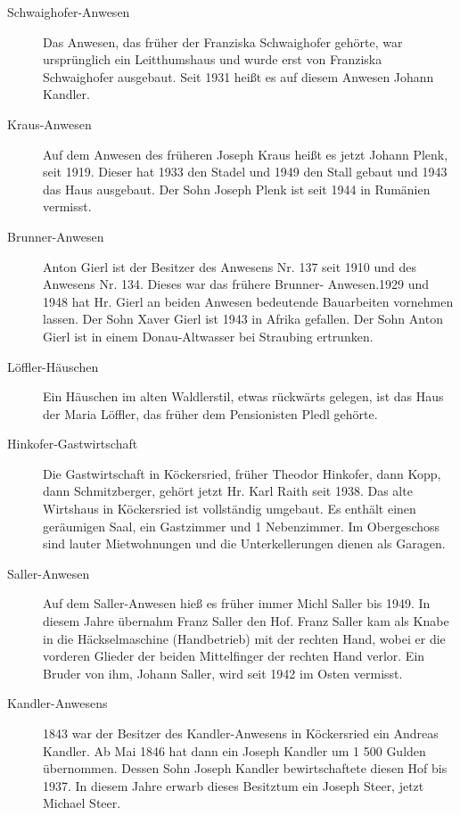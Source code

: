 \documentclass{book}
\begin{document}
\begin{description}
\item[Schwaighofer-Anwesen] Das Anwesen, das früher der Franziska
Schwaighofer gehörte, war ursprünglich ein Leitthumshaus und wurde erst
von Franziska Schwaighofer ausgebaut. Seit 1931 heißt es auf diesem
Anwesen Johann Kandler.

\item[Kraus-Anwesen] Auf dem Anwesen des früheren Joseph Kraus heißt es
jetzt Johann Plenk, seit 1919. Dieser hat 1933 den Stadel und 1949 den
Stall gebaut und 1943 das Haus ausgebaut. Der Sohn Joseph Plenk ist seit
1944 in Rumänien vermisst.

\item[Brunner-Anwesen] Anton Gierl ist der Besitzer des Anwesens Nr. 137
seit 1910 und des Anwesens Nr. 134. Dieses war das frühere Brunner-
Anwesen.1929 und 1948 hat Hr. Gierl an beiden Anwesen bedeutende
Bauarbeiten vornehmen lassen. Der Sohn Xaver Gierl ist 1943 in Afrika
gefallen. Der Sohn Anton Gierl ist in einem Donau-Altwasser bei
Straubing ertrunken.

\item[Löffler-Häuschen] Ein Häuschen im alten Waldlerstil, etwas
rückwärts gelegen, ist das Haus der Maria Löffler, das früher dem
Pensionisten Pledl gehörte.

\item[Hinkofer-Gastwirtschaft] Die Gastwirtschaft in Köckersried, früher
Theodor Hinkofer, dann Kopp, dann Schmitzberger, gehört jetzt Hr. Karl
Raith seit 1938. Das alte Wirtshaus in Köckersried ist vollständig
umgebaut. Es enthält einen geräumigen Saal, ein Gastzimmer und 1
Nebenzimmer. Im Obergeschoss sind lauter Mietwohnungen und die
Unterkellerungen dienen als Garagen.

\item[Saller-Anwesen] Auf dem Saller-Anwesen hieß es früher immer Michl
Saller bis 1949. In diesem Jahre übernahm Franz Saller den Hof. Franz
Saller kam als Knabe in die Häckselmaschine (Handbetrieb) mit der
rechten Hand, wobei er die vorderen Glieder der beiden Mittelfinger der
rechten Hand verlor. Ein Bruder von ihm, Johann Saller, wird seit 1942
im Osten vermisst.

\item[Kandler-Anwesens] 1843 war der Besitzer des Kandler-Anwesens in
Köckersried ein Andreas Kandler. Ab Mai 1846 hat dann ein Joseph Kandler
um 1 500 Gulden übernommen. Dessen Sohn Joseph Kandler bewirtschaftete
diesen Hof bis 1937. In diesem Jahre erwarb dieses Besitztum ein Joseph
Steer, jetzt Michael Steer.


\end{description}
\end{document}
